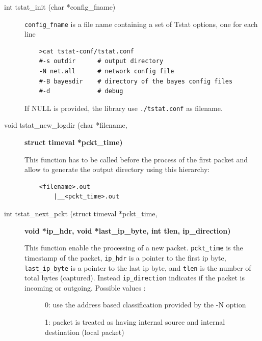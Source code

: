 \documentclass[11pt]{article}
\begin{document}
\begin{description}

\item[{int tstat\_init (char *config\_fname)}] \mbox{}

\texttt{config\_fname} is a file name containing a set of Tstat options, one 
for each line

\begin{small}\begin{verbatim}
    >cat tstat-conf/tstat.conf
    #-s outdir      # output directory
    -N net.all      # network config file 
    #-B bayesdir    # directory of the bayes config files
    #-d             # debug
\end{verbatim}\end{small} \noindent
If NULL is provided, the library use \texttt{./tstat.conf} as filename.


\item[{void tstat\_new\_logdir (char *filename,}] \textbf{struct timeval *pckt\_time)}

This function has to be called before the process of the first packet
and allow to generate the output directory using this hierarchy:

\begin{small}\begin{verbatim}
    <filename>.out
        |__<pckt_time>.out
\end{verbatim}\end{small} \noindent
\item[{int tstat\_next\_pckt (struct timeval *pckt\_time,}] \textbf{void *ip\_hdr, void *last\_ip\_byte, int tlen, ip\_direction)}

This function enable the processing of a new packet.
\texttt{pckt\_time}  is the timestamp of the packet, \texttt{ip\_hdr} is a pointer to the first ip byte,
\texttt{last\_ip\_byte} is a pointer to the last ip byte, and \texttt{tlen} is the number of total bytes (captured).
Instead \texttt{ip\_direction} indicates if the packet is incoming or outgoing. Possible values :

\begin{description}

\item[{}] \mbox{}

0: use the address based classification provided by the -N option


\item[{}] \mbox{}

1: packet is treated as having internal source and internal destination (local packet)



\end{description}
\end{description}
\end{document}
